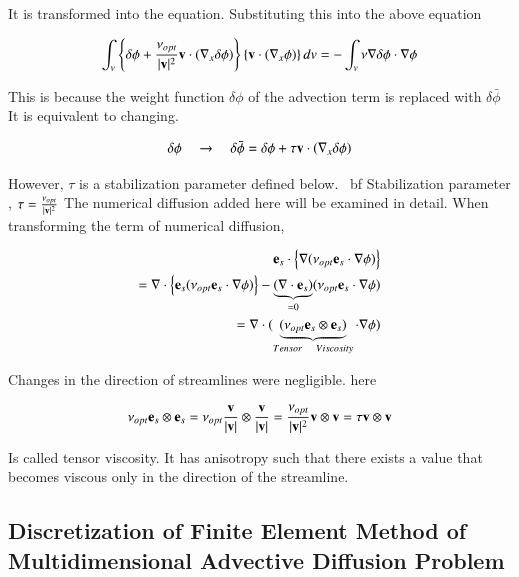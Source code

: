 It is transformed into the equation. Substituting this into the above equation

\begin{equation}
\int_v \left\{{\delta\phi}+\frac{\nu_{opt}}{|\mathbf{v}|^2}{\mathbf{v}}\cdot(\nabla_x{\delta\phi})\right\}\left\{{\mathbf{v}}\cdot(\nabla_x\phi)\right\} dv = -\int_v\nu \nabla{\delta\phi} \cdot \nabla{\phi}
\end{equation}

This is because the weight function $\delta\phi$ of the advection term is replaced with $\delta\bar{\phi}$
It is equivalent to changing.

\begin{equation}
 \delta\phi \quad \rightarrow \quad \delta\bar{\phi} = {\delta\phi}+\tau{\mathbf{v}}\cdot(\nabla_x{\delta\phi})
\end{equation}

However, $\tau$ is a stabilization parameter defined below.
{\ bf Stabilization parameter}
, $\tau = \frac{\nu_{opt}}{|\mathbf{v}|^2}$
The numerical diffusion added here will be examined in detail.
When transforming the term of numerical diffusion,

\begin{eqnarray}
{\mathbf{e}_s} \cdot \left\{ \nabla( \nu_{opt} {\mathbf{e}_s} \cdot {\nabla\phi} ) \right\} \\ = \nabla\cdot \left\{{\mathbf{e}_s}(\nu_{opt}{\mathbf{e}_s}\cdot{\nabla\phi})\right\} - \underbrace{(\nabla\cdot{\mathbf{e}_s})}_{=0} (\nu_{opt}{\mathbf{e}_s}\cdot{\nabla\phi})\\									=\nabla\cdot(\underbrace{(\nu_{opt}{\mathbf{e}_s}\otimes{\mathbf{e}_s})}_{Tensor \quad Viscosity}\cdot{\nabla\phi})
\end{eqnarray}

Changes in the direction of streamlines were negligible. here

\begin{equation}
\nu_{opt}{\mathbf{e}_s}\otimes{\mathbf{e}_s} = \nu_{opt}\frac{\mathbf{v}}{|\mathbf{v}|}\otimes\frac{\mathbf{v}}{|{\mathbf{v}}|} = \frac{\nu_{opt}}{|\mathbf{v}|^2}{\mathbf{v}}\otimes{\mathbf{v}} = \tau{\mathbf{v}}\otimes{\mathbf{v}}
\end{equation}

Is called tensor viscosity. It has anisotropy such that there exists a value that becomes viscous only in the direction of the streamline.
\subsection{Discretization of Finite Element Method of Multidimensional Advective Diffusion Problem}
